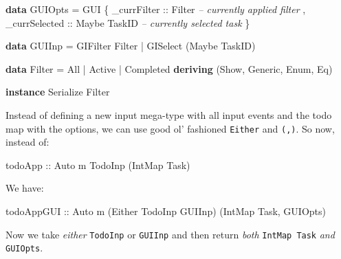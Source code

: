 \documentclass[]{article}
\newenvironment{Shaded}{}{}
\newcommand{\KeywordTok}[1]{\textcolor[rgb]{0.00,0.44,0.13}{\textbf{{#1}}}}
\newcommand{\DataTypeTok}[1]{\textcolor[rgb]{0.56,0.13,0.00}{{#1}}}
\newcommand{\CommentTok}[1]{\textcolor[rgb]{0.38,0.63,0.69}{\textit{{#1}}}}
\newcommand{\OtherTok}[1]{\textcolor[rgb]{0.00,0.44,0.13}{{#1}}}
\newcommand{\FunctionTok}[1]{\textcolor[rgb]{0.02,0.16,0.49}{{#1}}}
\newcommand{\NormalTok}[1]{{#1}}
\begin{document}
\begin{Shaded}
\begin{Highlighting}[]
\KeywordTok{data} \DataTypeTok{GUIOpts} \FunctionTok{=} \DataTypeTok{GUI} \NormalTok{\{ _}\OtherTok{currFilter   ::} \DataTypeTok{Filter}        \CommentTok{-- currently applied filter}
                   \NormalTok{, _}\OtherTok{currSelected ::} \DataTypeTok{Maybe} \DataTypeTok{TaskID}  \CommentTok{-- currently selected task}
                   \NormalTok{\}}

\KeywordTok{data} \DataTypeTok{GUIInp} \FunctionTok{=} \DataTypeTok{GIFilter} \DataTypeTok{Filter}
            \FunctionTok{|} \DataTypeTok{GISelect} \NormalTok{(}\DataTypeTok{Maybe} \DataTypeTok{TaskID}\NormalTok{)}

\KeywordTok{data} \DataTypeTok{Filter} \FunctionTok{=} \DataTypeTok{All} \FunctionTok{|} \DataTypeTok{Active} \FunctionTok{|} \DataTypeTok{Completed}
            \KeywordTok{deriving} \NormalTok{(}\DataTypeTok{Show}\NormalTok{, }\DataTypeTok{Generic}\NormalTok{, }\DataTypeTok{Enum}\NormalTok{, }\DataTypeTok{Eq}\NormalTok{)}

\KeywordTok{instance} \DataTypeTok{Serialize} \DataTypeTok{Filter}
\end{Highlighting}
\end{Shaded}

Instead of defining a new input mega-type with all input events and the
todo map with the options, we can use good ol' fashioned \texttt{Either}
and \texttt{(,)}. So now, instead of:

\begin{Shaded}
\begin{Highlighting}[]
\OtherTok{todoApp ::} \DataTypeTok{Auto} \NormalTok{m }\DataTypeTok{TodoInp} \NormalTok{(}\DataTypeTok{IntMap} \DataTypeTok{Task}\NormalTok{)}
\end{Highlighting}
\end{Shaded}

We have:

\begin{Shaded}
\begin{Highlighting}[]
\OtherTok{todoAppGUI ::} \DataTypeTok{Auto} \NormalTok{m (}\DataTypeTok{Either} \DataTypeTok{TodoInp} \DataTypeTok{GUIInp}\NormalTok{) (}\DataTypeTok{IntMap} \DataTypeTok{Task}\NormalTok{, }\DataTypeTok{GUIOpts}\NormalTok{)}
\end{Highlighting}
\end{Shaded}

Now we take \emph{either} \texttt{TodoInp} or \texttt{GUIInp} and then
return \emph{both} \texttt{IntMap\ Task} \emph{and} \texttt{GUIOpts}.
\end{document}
